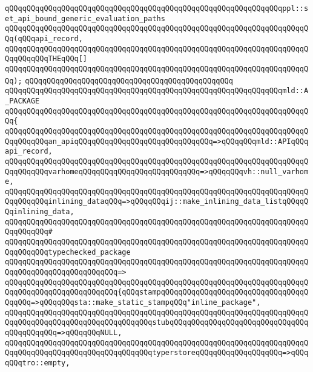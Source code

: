 \verb|qQQqqQQqqQQqqQQqqQQqqQQqqQQqqQQqqQQqqQQqqQQqqQQqqQQqqQQqqQQqqQQqppl::set_api_bound_generic_evaluation_paths|\newline
\verb|qQQqqQQqqQQqqQQqqQQqqQQqqQQqqQQqqQQqqQQqqQQqqQQqqQQqqQQqqQQqqQQqqQQqqQQq(qQQqapi_record,|\newline
\verb|qQQqqQQqqQQqqQQqqQQqqQQqqQQqqQQqqQQqqQQqqQQqqQQqqQQqqQQqqQQqqQQqqQQqqQQqqQQqqQQqTHEqQQq[]|\newline
\verb|qQQqqQQqqQQqqQQqqQQqqQQqqQQqqQQqqQQqqQQqqQQqqQQqqQQqqQQqqQQqqQQqqQQqqQQq);|\newline
\verb|qQQqqQQqqQQqqQQqqQQqqQQqqQQqqQQqqQQqqQQqqQQqqQQq|\newline
\verb|qQQqqQQqqQQqqQQqqQQqqQQqqQQqqQQqqQQqqQQqqQQqqQQqqQQqqQQqqQQqqQQqmld::A_PACKAGE|\newline
\verb|qQQqqQQqqQQqqQQqqQQqqQQqqQQqqQQqqQQqqQQqqQQqqQQqqQQqqQQqqQQqqQQqqQQqqQQq{|\newline
\verb|qQQqqQQqqQQqqQQqqQQqqQQqqQQqqQQqqQQqqQQqqQQqqQQqqQQqqQQqqQQqqQQqqQQqqQQqqQQqqQQqan_apiqQQqqQQqqQQqqQQqqQQqqQQqqQQqqQQq=>qQQqqQQqmld::APIqQQqapi_record,|\newline
\verb|qQQqqQQqqQQqqQQqqQQqqQQqqQQqqQQqqQQqqQQqqQQqqQQqqQQqqQQqqQQqqQQqqQQqqQQqqQQqqQQqvarhomeqQQqqQQqqQQqqQQqqQQqqQQqqQQq=>qQQqqQQqvh::null_varhome,|\newline
\verb|qQQqqQQqqQQqqQQqqQQqqQQqqQQqqQQqqQQqqQQqqQQqqQQqqQQqqQQqqQQqqQQqqQQqqQQqqQQqqQQqinlining_dataqQQq=>qQQqqQQqij::make_inlining_data_listqQQqqQQqinlining_data,|\newline
\verb|qQQqqQQqqQQqqQQqqQQqqQQqqQQqqQQqqQQqqQQqqQQqqQQqqQQqqQQqqQQqqQQqqQQqqQQqqQQqqQQq#|\newline
\verb|qQQqqQQqqQQqqQQqqQQqqQQqqQQqqQQqqQQqqQQqqQQqqQQqqQQqqQQqqQQqqQQqqQQqqQQqqQQqqQQqtypechecked_package|\newline
\verb|qQQqqQQqqQQqqQQqqQQqqQQqqQQqqQQqqQQqqQQqqQQqqQQqqQQqqQQqqQQqqQQqqQQqqQQqqQQqqQQqqQQqqQQqqQQqqQQq=>|\newline
\verb|qQQqqQQqqQQqqQQqqQQqqQQqqQQqqQQqqQQqqQQqqQQqqQQqqQQqqQQqqQQqqQQqqQQqqQQqqQQqqQQqqQQqqQQqqQQqqQQq{qQQqstampqQQqqQQqqQQqqQQqqQQqqQQqqQQqqQQqqQQqqQQq=>qQQqqQQqsta::make_static_stampqQQq"inline_package",|\newline
\verb|qQQqqQQqqQQqqQQqqQQqqQQqqQQqqQQqqQQqqQQqqQQqqQQqqQQqqQQqqQQqqQQqqQQqqQQqqQQqqQQqqQQqqQQqqQQqqQQqqQQqqQQqstubqQQqqQQqqQQqqQQqqQQqqQQqqQQqqQQqqQQqqQQqqQQq=>qQQqqQQqNULL,|\newline
\verb|qQQqqQQqqQQqqQQqqQQqqQQqqQQqqQQqqQQqqQQqqQQqqQQqqQQqqQQqqQQqqQQqqQQqqQQqqQQqqQQqqQQqqQQqqQQqqQQqqQQqqQQqtyperstoreqQQqqQQqqQQqqQQqqQQq=>qQQqqQQqtro::empty,|\newline
